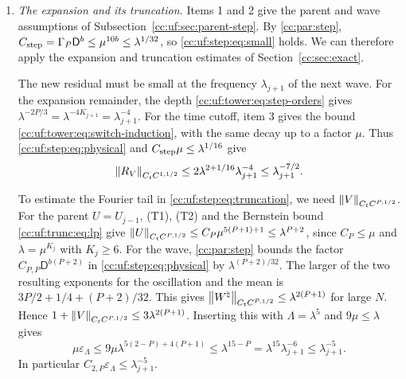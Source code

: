 \begin{enumerate}[leftmargin=*]
On the interval where the cutoff changes, \eqref{cc:uf:tower:eq:switch-small}
gives $\gamma\le e^{3-L_j}=e^3\lambda_{j+1}^{-4}$. Since
$|\widetilde\chi'|\le Cr$ and $Ce^3r\le\mu$ for large $N$ by item~2,
\begin{equation}\label{cc:uf:tower:eq:switch-induction}
 \|\widetilde\chi'\gamma\|_\infty\le\mu\lambda_{j+1}^{-4}.
\end{equation}
The same estimate holds for the first wave since $\widetilde\chi_1'\equiv0$.

\item \emph{The expansion and its truncation.}
Items 1 and 2 give the parent and wave assumptions of
Subsection~\ref{cc:uf:sec:parent-step}. By \eqref{cc:par:step},
$C_{\rm step}=\Gamma_P\mathsf D^b\le\mu^{10b}\le\lambda^{1/32}$,
so \eqref{cc:uf:step:eq:small} holds. We can therefore apply the
expansion and truncation estimates of Section~\ref{cc:sec:exact}.

The new residual must be small at the frequency $\lambda_{j+1}$ of the
next wave. For the expansion remainder, the depth
\eqref{cc:uf:tower:eq:step-orders} gives
$\lambda^{-2P/3}=\lambda^{-4K_{j+1}}=\lambda_{j+1}^{-4}$.
For the time cutoff, item 3 gives the bound
\eqref{cc:uf:tower:eq:switch-induction}, with the same decay up to a factor $\mu$. Thus
\eqref{cc:uf:step:eq:physical} and $C_{\rm step}\mu\le\lambda^{1/16}$ give
\begin{equation}\label{cc:uf:tower:eq:frequency}
 \left\lVert R_V\right\rVert_{C_tC^{1,1/2}}\le2\lambda^{2+1/16}\lambda_{j+1}^{-4}
 \le\lambda_{j+1}^{-7/2}.
\end{equation}

To estimate the Fourier tail in \eqref{cc:uf:step:eq:truncation}, we
need $\left\lVert V\right\rVert_{C_tC^{P,1/2}}$. For the parent $U=U_{j-1}$, (T1), (T2)
and the Bernstein bound \eqref{cc:uf:trunc:eq:lp} give
$\left\lVert U\right\rVert_{C_tC^{P,1/2}}\le C_P\mu^{5(P+1)+1}\le\lambda^{P+2}$,
since $C_P\le\mu$ and $\lambda=\mu^{K_j}$ with $K_j\ge6$.
For the wave, \eqref{cc:par:step} bounds the factor
$C_{P,P}\mathsf D^{b(P+2)}$ in \eqref{cc:uf:step:eq:physical}
by $\lambda^{(P+2)/32}$. The larger of the two resulting exponents
for the oscillation and the mean is $3P/2+1/4+(P+2)/32$.
This gives $\left\lVert W^\natural\right\rVert_{C_tC^{P,1/2}}\le\lambda^{2(P+1)}$
for large $N$. Hence $1+\left\lVert V\right\rVert_{C_tC^{P,1/2}}\le3\lambda^{2(P+1)}$.
Inserting this with $\Lambda=\lambda^5$ and $9\mu\le\lambda$ gives
\begin{equation}\label{cc:uf:tower:eq:tail-small}
 \mu\varepsilon_\Lambda\le9\mu\lambda^{5(2-P)+4(P+1)}
 \le\lambda^{15-P}
 =\lambda^{15}\lambda_{j+1}^{-6}\le\lambda_{j+1}^{-5}.
\end{equation}
In particular $C_{2,P}\varepsilon_\Lambda\le\lambda_{j+1}^{-5}$.


\end{enumerate}
